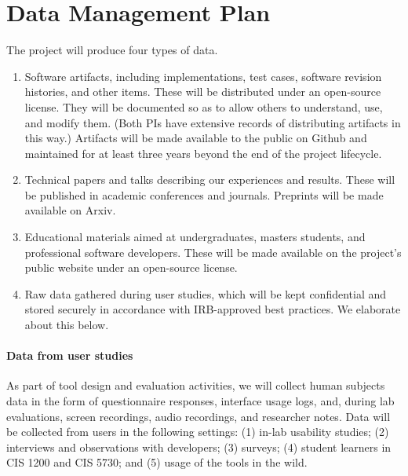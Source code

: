 \section*{Data Management Plan}

The project will produce four types of data.

\begin{enumerate}
\item Software artifacts,
including implementations, test cases, software revision histories, and
other items.  These will be distributed under an open-source
license.  They will be documented so as to allow others to understand,
use, and modify them.  (Both PIs have extensive records of
distributing artifacts in this way.)  Artifacts will be made available
to the public on Github and maintained for at least three years beyond
the end of the project lifecycle.

\item Technical papers and talks describing our experiences
and results.  These will be published in academic conferences and journals.
Preprints will be made available on Arxiv.

\item Educational materials aimed at undergraduates, masters students,
and professional software developers. These will be made available on the
project's public website under an open-source license.

\item Raw data gathered during user studies, which will be kept
confidential and stored securely in accordance with IRB-approved best
practices. We elaborate about this below.
\end{enumerate}


\paragraph{Data from user studies}
As part of tool design and
evaluation activities, we will collect human subjects data in the form of questionnaire responses, interface usage
logs, and, during lab evaluations, screen recordings, audio recordings, and
researcher notes. Data will be collected from users in the following settings: (1)
in-lab usability studies; (2) interviews and observations with developers;
(3) surveys; (4) student learners in CIS 1200 and CIS 5730; and (5) usage of the tools
in the wild.

